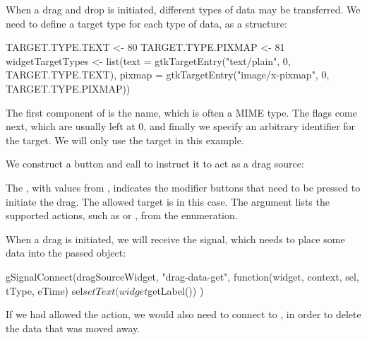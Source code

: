 When a drag and drop is initiated, different types of data may be
transferred. We need to define a target type for each type of data, as
a  structure:
\begin{Schunk}
\begin{Sinput}
 TARGET.TYPE.TEXT   <- 80                 
 TARGET.TYPE.PIXMAP <- 81                  
 widgetTargetTypes <- 
   list(text = gtkTargetEntry("text/plain", 0, 
          TARGET.TYPE.TEXT),
        pixmap = gtkTargetEntry("image/x-pixmap", 0, 
          TARGET.TYPE.PIXMAP))
\end{Sinput}
\end{Schunk}
%
The first component of  is the name, which is often
a MIME type. The flags come next, which are usually left at $0$, and
finally we specify an arbitrary identifier for the target. We will
only use the  target in this example.

We construct a button and call  to instruct
it to act as a drag source:
\begin{Schunk}
\end{Schunk}
%
The , with values from
, indicates the modifier buttons that need to
be pressed to initiate the drag. The allowed target is  in
this case. The  argument lists the
supported actions, such as  or , from the
 enumeration.

When a drag is initiated, we will receive the 
signal, which needs to place some data into the passed
 object:
\begin{Schunk}
\begin{Sinput}
 gSignalConnect(dragSourceWidget, "drag-data-get", 
                function(widget, context, sel, tType, eTime) {
                  sel$setText(widget$getLabel()) 
                })
\end{Sinput}
\end{Schunk}
%
If we had allowed the  action, we would also need to
connect to , in order to delete the data that
was moved away.

